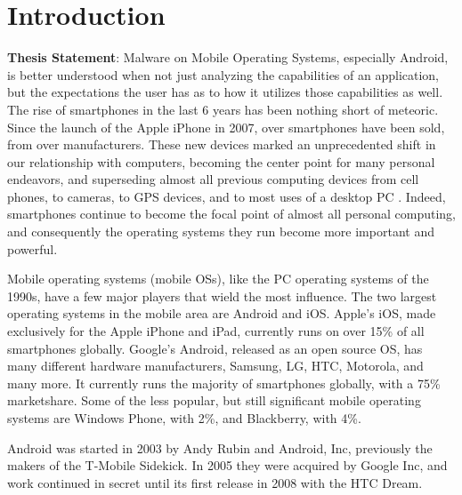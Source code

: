 \chapter{Introduction}
\label{sec:intro}

\textbf{Thesis Statement}: Malware on Mobile Operating Systems, especially Android, is better understood when not just analyzing the capabilities of an application, but the expectations the user has as to how it utilizes those capabilities as well.\\


The rise of smartphones in the last 6 years has been nothing short of meteoric. Since the launch of the Apple iPhone in 2007, over  smartphones have been sold, from over  manufacturers. These new devices marked an unprecedented shift in our relationship with computers, becoming the center point for many personal endeavors, and superseding almost all previous computing devices from cell phones, to cameras, to GPS devices, and to most uses of a desktop PC . Indeed, smartphones continue to become the focal point of almost all personal computing, and consequently the operating systems they run become more important and powerful.

Mobile operating systems (mobile OSs), like the PC operating systems of the 1990s, have a few major players that wield the most influence. The two largest operating systems in the mobile area are Android and iOS. Apple's iOS, made exclusively for the Apple iPhone and iPad, currently runs on over 15\% of all smartphones globally. Google's Android, released as an open source OS, has many different hardware manufacturers, Samsung, LG, HTC, Motorola, and many more. It currently runs the majority of smartphones globally, with a 75\% marketshare. Some of the less popular, but still significant mobile operating systems are Windows Phone, with 2\%, and Blackberry, with 4\%. 

 Android was started in 2003 by Andy Rubin and Android, Inc, previously the makers of the T-Mobile Sidekick. In 2005 they were acquired by Google Inc, and work continued in secret until its first release in 2008 with the HTC Dream.

